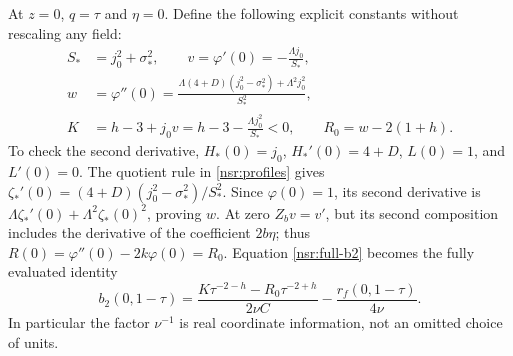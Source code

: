 At \(z=0\), \(q=\tau\) and \(\eta=0\). Define the following
explicit constants without rescaling any field:
\begin{equation}\label{nsr:origin-constants}
 \begin{split}
 S_*&=j_0^2+\sigma_*^2,\qquad
 v=\varphi'(0)=-\frac{\Lambda j_0}{S_*},\\
 w&=\varphi''(0)
 =\frac{\Lambda(4+D)(j_0^2-\sigma_*^2)+\Lambda^2j_0^2}{S_*^2},\\
 K&=h-3+j_0v=h-3-\frac{\Lambda j_0^2}{S_*}<0,\qquad
 R_0=w-2(1+h).
 \end{split}
\end{equation}
To check the second derivative, \(H_*(0)=j_0\),
\(H_*'(0)=4+D\), \(L(0)=1\), and \(L'(0)=0\).
The quotient rule in \eqref{nsr:profiles} gives
\(\zeta_*'(0)=(4+D)(j_0^2-\sigma_*^2)/S_*^2\).
Since \(\varphi(0)=1\), its second derivative is
\(\Lambda\zeta_*'(0)+\Lambda^2\zeta_*(0)^2\), proving \(w\).
At zero \(Z_bv=v'\), but its second composition includes the
derivative of the coefficient \(2b\eta\); thus
\(R(0)=\varphi''(0)-2k\varphi(0)=R_0\).
Equation \eqref{nsr:full-b2} becomes the fully evaluated identity
\begin{equation}\label{nsr:origin-b2}
 \boxed{\quad
 b_2(0,1-\tau)=\frac{K\tau^{-2-h}-R_0\tau^{-2+h}}{2\nu C}
                            -\frac{r_f(0,1-\tau)}{4\nu}.
 \quad}
\end{equation}
In particular the factor \(\nu^{-1}\) is real coordinate information,
not an omitted choice of units.

